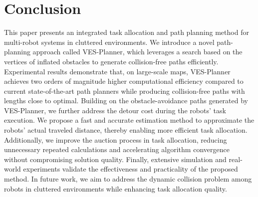 \documentclass[letterpaper, 10pt, journal, twoside]{support/IEEEtran}
\begin{document}
\section{Conclusion}\label{sec:conclusion}
This paper presents an integrated task allocation and path planning method for multi-robot systems in cluttered environments. We introduce a novel path-planning approach called VES-Planner, which leverages a search based on the vertices of inflated obstacles to generate collision-free paths efficiently. Experimental results demonstrate that, on large-scale maps, VES-Planner achieves two orders of magnitude higher computational efficiency compared to current state-of-the-art path planners while producing collision-free paths with lengths close to optimal.
Building on the obstacle-avoidance paths generated by VES-Planner, we further address the detour cost during the robots' task execution. We propose a fast and accurate estimation method to approximate the robots' actual traveled distance, thereby enabling more efficient task allocation. Additionally, we improve the auction process in task allocation, reducing unnecessary repeated calculations and accelerating algorithm convergence without compromising solution quality. Finally, extensive simulation and real-world experiments validate the effectiveness and practicality of the proposed method.
In future work, we aim to address the dynamic collision problem among robots in cluttered environments while enhancing task allocation quality.



\end{document}
